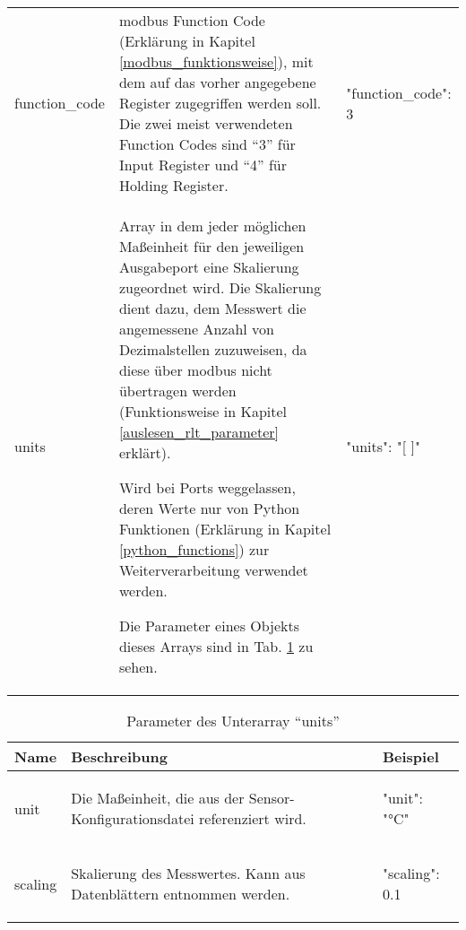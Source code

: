 \begin{enumerate}
\begin{longtable}[h]{p{} p{} | p{}}
    function\_code 	& \gls{modbus} Function Code (Erklärung in Kapitel \ref{modbus_funktionsweise}), mit dem auf das vorher angegebene Register zugegriffen werden soll. Die zwei meist verwendeten Function Codes sind \enquote{3} für Input Register und \enquote{4} für Holding Register. & 
    \begin{jsonTable}
"function_code": 3
    \end{jsonTable} 
    \\
    units 	& Array in dem jeder möglichen Maßeinheit für den jeweiligen Ausgabeport eine Skalierung zugeordnet wird. Die Skalierung dient \zB dazu, dem Messwert die angemessene Anzahl von Dezimalstellen zuzuweisen, da diese über \gls{modbus} nicht übertragen werden (Funktionsweise in Kapitel \ref{auslesen_rlt_parameter} erklärt).
    
    Wird bei Ports weggelassen, deren Werte nur von Python Funktionen (Erklärung in Kapitel \ref{python_functions}) zur Weiterverarbeitung verwendet werden. 
    
    Die Parameter eines Objekts dieses Arrays sind in Tab. \ref{tab:units_array_parameter} zu sehen.  & 
    \begin{jsonTable}
"units": "[ ]"
    \end{jsonTable} 
    \\
\end{longtable}

	
\begin{table}[H]
    \caption{Parameter des Unterarray \enquote{units}}
    \label{tab:units_array_parameter}
    \begin{tabular}{p{} p{} | p{}}
        \toprule
        \textbf{Name} & \textbf{Beschreibung} & \textbf{Beispiel} \\
        \midrule
        unit      	& Die Maßeinheit, die aus der Sensor-Konfigurationsdatei referenziert wird. & 
        \begin{jsonTable}
"unit": "°C"
        \end{jsonTable} 
        \\
        scaling 	& Skalierung des Messwertes. Kann aus Datenblättern entnommen werden. & 
        \begin{jsonTable}
"scaling": 0.1
        \end{jsonTable} 
        \\
        \bottomrule
    \end{tabular}
\end{table}
		

\end{enumerate}
